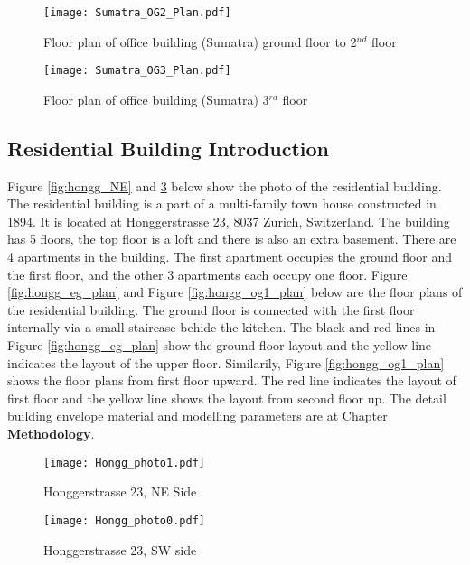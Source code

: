 \documentclass[11pt, a4paper]{article}
\theoremstyle{definition}
\begin{document}
		\begin{figure}[H]
		  \centering
		  \texttt{[image: Sumatra\_OG2\_Plan.pdf]}
		  \caption{Floor plan of office building (Sumatra) ground floor to 2$^{nd}$ floor}
		  \label{fig:sumatra_og2}
		 \end{figure}

		\begin{figure}[H]
		  \centering
		  \texttt{[image: Sumatra\_OG3\_Plan.pdf]}
		  \caption{Floor plan of office building (Sumatra) 3$^{rd}$ floor}
		  \label{fig:sumatra_og3}
		\end{figure}
		
	\subsection{Residential Building Introduction}
		Figure \ref{fig:hongg_NE} and \ref{fig:hongg_SW} below show the photo of the residential building. The residential building is a part of a multi-family town house constructed in 1894. It is located at Honggerstrasse 23, 8037 Zurich, Switzerland. The building has 5 floors, the top floor is a loft and there is also an extra basement. There are 4 apartments in the building. The first apartment occupies the ground floor and the first floor, and the other 3 apartments each occupy one floor. Figure \ref{fig:hongg_eg_plan} and Figure \ref{fig:hongg_og1_plan} below are the floor plans of the residential building. The ground floor is connected with the first floor internally via a small staircase behide the kitchen. The black and red lines in Figure \ref{fig:hongg_eg_plan} show the ground floor layout and the yellow line indicates the layout of the upper floor. Similarily, Figure \ref{fig:hongg_og1_plan} shows the floor plans from first floor upward. The  red line indicates the layout of first floor and the yellow line shows the layout from second floor up. The detail building envelope material and modelling parameters are at Chapter \textbf{Methodology}.\\
		

		\begin{figure}[htbp]
		\centering
		\begin{minipage}[t]{0.48\textwidth}
		\centering
		\texttt{[image: Hongg\_photo1.pdf]}
		\caption{Honggerstrasse 23, NE Side}
		\label{fig:hongg_NE}
		\end{minipage}
		\begin{minipage}[t]{0.48\textwidth}
		\centering
		\texttt{[image: Hongg\_photo0.pdf]}
		\caption{Honggerstrasse 23, SW side}
		\label{fig:hongg_SW}
		\end{minipage}
		\end{figure}
\end{document}
